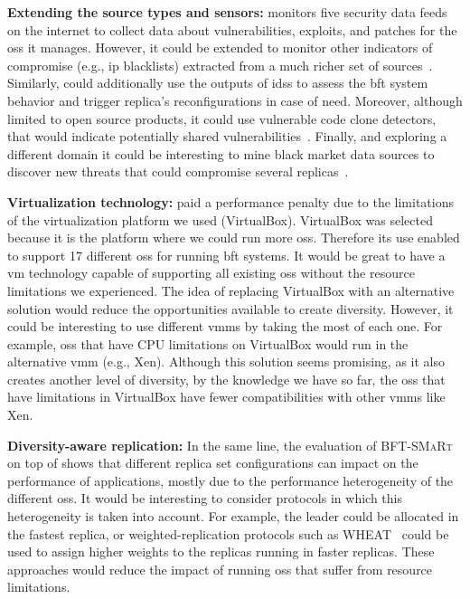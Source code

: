 \textbf{Extending the \system source types and sensors:}
\system monitors five security data feeds on the internet to collect data about vulnerabilities, exploits, and patches for the \glspl{os} it manages.
However, it could be extended to monitor other indicators of compromise (e.g., \gls{ip} blacklists) extracted from a much richer set of sources~\cite{Liao:2016,Sabottke:2015}.
Similarly, \system could additionally use the outputs of \glspl{ids} to assess the \gls{bft} system behavior and trigger replica's reconfigurations in case of need.
Moreover, although limited to open source products, it could use vulnerable code clone detectors, that would indicate potentially shared vulnerabilities~\cite{Kim:2017}.
Finally, and exploring a different domain it could be interesting to mine black market data sources to discover new threats that could compromise several replicas~\cite{Allodi:2014}.


\textbf{Virtualization technology:}
\system paid a performance penalty due to the limitations of the virtualization platform we used (VirtualBox).
VirtualBox was selected because it is the platform where we could run more \glspl{os}.
Therefore its use enabled \system to support 17 different \glspl{os} for running \gls{bft} systems.
It would be great to have a \gls{vm} technology capable of supporting all existing \glspl{os} without the resource limitations we experienced.
The idea of replacing VirtualBox with an alternative solution would reduce the opportunities available to create diversity.
However, it could be interesting to use different \glspl{vmm} by taking the most of each one. 
For example, \glspl{os} that have CPU limitations on VirtualBox would run in the alternative \gls{vmm} (e.g., Xen).
Although this solution seems promising, as it also creates another level of diversity, by the knowledge we have so far, the \glspl{os} that have limitations in VirtualBox have fewer compatibilities with other \glspl{vmm} like Xen.

\textbf{Diversity-aware replication:}
In the same line, the evaluation of \textsc{BFT-SMaRt} on top of \system shows that different replica set configurations can impact on the performance of applications, mostly due to the performance heterogeneity of the different \glspl{os}.
It would be interesting to consider protocols in which this heterogeneity is taken into account.
For example, the leader could be allocated in the fastest replica, or weighted-replication protocols such as WHEAT~\cite{Sousa:2015} could be used to assign higher weights to the replicas running in faster replicas.
These approaches would reduce the impact of running \glspl{os} that suffer from resource limitations.


